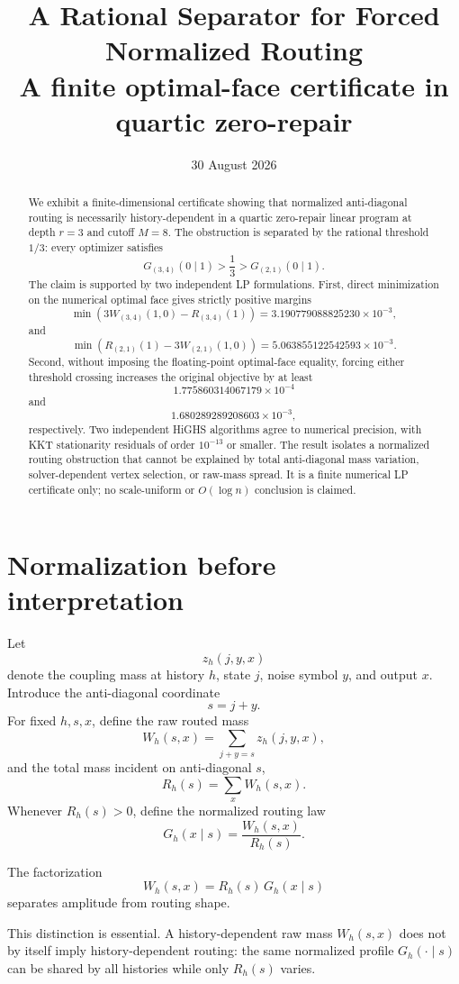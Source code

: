 \documentclass[11pt,a4paper]{article}
\title{\textbf{A Rational Separator for Forced Normalized Routing}\\
\large A finite optimal-face certificate in quartic zero-repair}
\author{}
\date{30 August 2026}
\newcommand{\Wp}{W_{(3,4)}(1,0)}
\newcommand{\Wm}{W_{(2,1)}(1,0)}
\newcommand{\Rp}{R_{(3,4)}(1)}
\newcommand{\Rm}{R_{(2,1)}(1)}
\begin{document}
\maketitle

\begin{abstract}
We exhibit a finite-dimensional certificate showing that normalized
anti-diagonal routing is necessarily history-dependent in a quartic
zero-repair linear program at depth \(r=3\) and cutoff \(M=8\).
The obstruction is separated by the rational threshold \(1/3\):
every optimizer satisfies
\[
G_{(3,4)}(0\mid1)>\frac13>G_{(2,1)}(0\mid1).
\]
The claim is supported by two independent LP formulations.
First, direct minimization on the numerical optimal face gives strictly
positive margins
\[
\min(3\Wp-\Rp)
=
3.190779088825230\times10^{-3},
\]
and
\[
\min(\Rm-3\Wm)
=
5.063855122542593\times10^{-3}.
\]
Second, without imposing the floating-point optimal-face equality,
forcing either threshold crossing increases the original objective by at least
\[
1.775860314067179\times10^{-4}
\]
and
\[
1.680289289208603\times10^{-3},
\]
respectively.
Two independent HiGHS algorithms agree to numerical precision, with KKT
stationarity residuals of order \(10^{-13}\) or smaller.
The result isolates a normalized routing obstruction that cannot be explained
by total anti-diagonal mass variation, solver-dependent vertex selection, or
raw-mass spread.
It is a finite numerical LP certificate only; no scale-uniform or
\(O(\log n)\) conclusion is claimed.
\end{abstract}

\section{Normalization before interpretation}

Let
\[
z_h(j,y,x)
\]
denote the coupling mass at history \(h\), state \(j\), noise symbol \(y\),
and output \(x\).  Introduce the anti-diagonal coordinate
\[
s=j+y.
\]
For fixed \(h,s,x\), define the raw routed mass
\[
W_h(s,x)
=
\sum_{j+y=s} z_h(j,y,x),
\]
and the total mass incident on anti-diagonal \(s\),
\[
R_h(s)
=
\sum_x W_h(s,x).
\]
Whenever \(R_h(s)>0\), define the normalized routing law
\[
G_h(x\mid s)
=
\frac{W_h(s,x)}{R_h(s)}.
\]

The factorization
\[
\boxed{
W_h(s,x)=R_h(s)\,G_h(x\mid s)
}
\]
separates amplitude from routing shape.

This distinction is essential.  A history-dependent raw mass
\(W_h(s,x)\) does not by itself imply history-dependent routing:
the same normalized profile \(G_h(\cdot\mid s)\) can be shared by all
histories while only \(R_h(s)\) varies.
\end{document}
